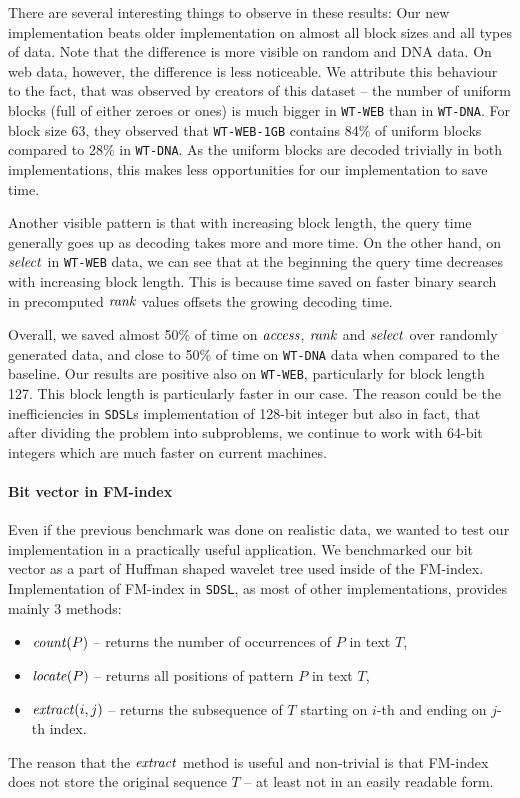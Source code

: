 There are several interesting things to observe in these results: Our new implementation
beats older implementation on almost all block sizes and all types of data. Note that the difference is more
visible on random and DNA data. On web data, however, the difference is less noticeable. We attribute
this behaviour to the fact, that was observed by creators of this dataset -- the number of
uniform blocks (full of either zeroes or ones) is much bigger in \texttt{WT-WEB} than in \texttt{WT-DNA}.
For block size 63, they observed that \texttt{WT-WEB-1GB} contains 84\% of uniform blocks compared to 28\% in
\texttt{WT-DNA}. As the uniform blocks are decoded trivially in both implementations, this makes less opportunities
for our implementation to save time.

Another visible pattern is that with increasing block length, the query time generally goes up as decoding takes
more and more time. On the other hand, on $\mathit{select}$ in \texttt{WT-WEB} data, we can see that at the beginning
the query time decreases with increasing block length. This is because time saved on faster binary search in
precomputed $\mathit{rank}$ values offsets the growing decoding time.

Overall, we saved almost 50\% of time on $\mathit{access}$, $\mathit{rank}$ and $\mathit{select}$ over randomly generated data,
and close to 50\% of time on \texttt{WT-DNA} data when compared to the baseline. Our results are positive
also on \texttt{WT-WEB}, particularly for block length 127. This block length is particularly faster in our
case. The reason could be the inefficiencies in \texttt{SDSL}s implementation of 128-bit integer but also
in fact, that after dividing the problem into subproblems, we continue to work with 64-bit integers which
are much faster on current machines.

\paragraph{Bit vector in FM-index}

Even if the previous benchmark was done on realistic data, we wanted to test our implementation in
a practically useful application. We benchmarked our bit vector as a part of Huffman shaped
wavelet tree used inside of the FM-index. Implementation of FM-index in \texttt{SDSL}, as most
of other implementations, provides mainly 3 methods:
\begin{itemize}
	\item $\mathit{count}(P)$ -- returns the number of occurrences of $P$ in text $T$,
	\item $\mathit{locate}(P)$ -- returns all positions of pattern $P$ in text $T$,
	\item $\mathit{extract}(i, j)$ -- returns the subsequence of $T$ starting on $i$-th and ending on $j$-th index.
\end{itemize}
The reason that the $\mathit{extract}$ method is useful and non-trivial is that FM-index
does not store the original sequence $T$ -- at least not in an easily readable form.

